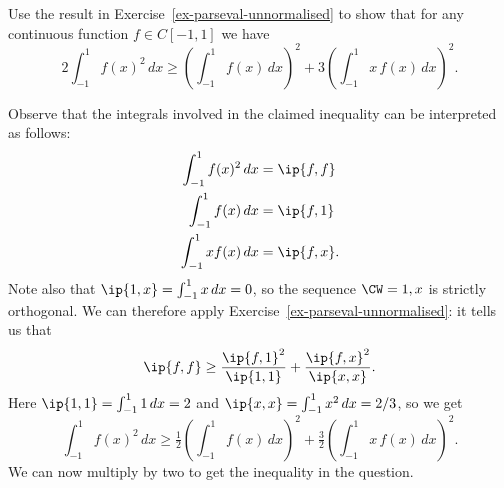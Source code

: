 \begin{exercise}\label{ex-parseval-i}
 Use the result in Exercise~\ref{ex-parseval-unnormalised} to show
 that for any continuous function $f\in C[-1,1]$ we have
 \[ \textstyle 
    2 \int_{-1}^1 f(x)^2\,dx \geq 
    \left(\int_{-1}^1 f(x)\,dx\right)^2 +
    3 \left(\int_{-1}^1 x\,f(x)\,dx\right)^2.
 \]
\end{exercise}
\begin{solution}
 Observe that the integrals involved in the claimed inequality can be
 interpreted as follows:
 \begin{align*}
  \int_{-1}^1 f(x)^2\,dx &= \ip{f,f} \\
  \int_{-1}^1 f(x)\,dx   &= \ip{f,1} \\
  \int_{-1}^1 x f(x)\,dx &= \ip{f,x}.
 \end{align*}
 Note also that $\ip{1,x}=\int_{-1}^1x\,dx=0$, so the sequence
 $\CW=1,x$ is strictly orthogonal.  We can therefore apply
 Exercise~\ref{ex-parseval-unnormalised}: it tells us that
 \[ \ip{f,f} \geq \frac{\ip{f,1}^2}{\ip{1,1}} + 
                  \frac{\ip{f,x}^2}{\ip{x,x}}.
 \]
 Here $\ip{1,1}=\int_{-1}^1 1\,dx=2$ and
 $\ip{x,x}=\int_{-1}^1x^2\,dx=2/3$, so we get
 \[ \int_{-1}^1 f(x)^2\, dx 
     \geq \tfrac{1}{2} \left(\int_{-1}^1 f(x)\,dx\right)^2 + 
          \tfrac{3}{2} \left(\int_{-1}^1 x\,f(x)\,dx\right)^2. 
 \]
 We can now multiply by two to get the inequality in the question.
\end{solution}

